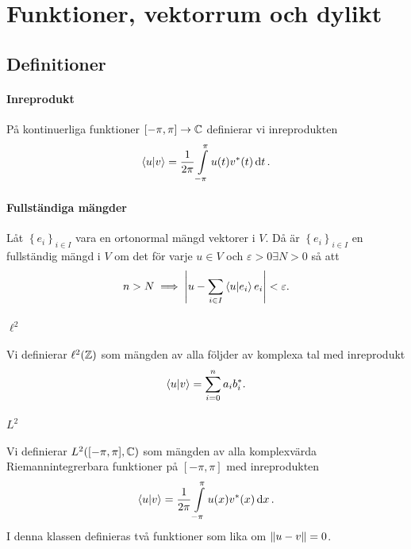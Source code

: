 \section{Funktioner, vektorrum och dylikt}

\subsection{Definitioner}

\paragraph{Inreprodukt}
På kontinuerliga funktioner $[-\pi, \pi] \to \mathbb{C}$ definierar vi inreprodukten
\begin{align*}
	\bra{u}\ket{v} = \frac{1}{2\pi}\int\limits_{-\pi}^{\pi}u(t)v^{*}(t)\dd{t}.
\end{align*}

\paragraph{Fullständiga mängder}
Låt $\left\{e_{i}\right\}_{i\in I}$ vara en ortonormal mängd vektorer i $V$. Då är $\left\{e_{i}\right\}_{i\in I}$ en fullständig mängd i $V$ om det för varje $u\in V$ och $\varepsilon >0 \exists N >0$ så att
\begin{align*}
	n > N\implies \abs{u - \sum\limits_{i\in I}\bra{u}\ket{e_{i}}e_{i}} < \varepsilon.
\end{align*}

\paragraph{$\ell^{2}$}
Vi definierar $\ell^{2}(\mathbb{Z})$ som mängden av alla följder av komplexa tal med inreprodukt
\begin{align*}
	\bra{u}\ket{v} = \sum\limits_{i = 0}^{n}a_{i}b_{i}^{*}.
\end{align*}

\paragraph{$L^{2}$}
Vi definierar $L^{2}([-\pi, \pi], \mathbb{C})$ som mängden av alla komplexvärda Riemannintegrerbara funktioner på $[-\pi, \pi]$ med inreprodukten
\begin{align*}
	\bra{u}\ket{v} = \frac{1}{2\pi}\int\limits_{-\pi}^{\pi}u(x)v^{*}(x)\dd{x}.
\end{align*}
I denna klassen definieras två funktioner som lika om $\norm{u - v} = 0$.

